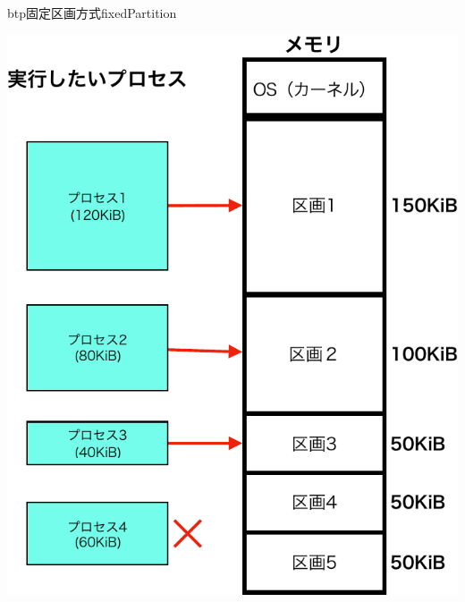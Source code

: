 \begin{myfig}{btp}{固定区画方式}{fixedPartition}
  \begin{minipage}{0.49\columnwidth}
    \begin{center}
      \includegraphics[scale=0.6]{Fig/fixedPartitionLoad-crop.pdf}
      \label{fig:fixedParthtionA}
    \end{center}
  \end{minipage}
  \begin{minipage}{0.49\columnwidth}
    \begin{center}

\end{center}
\end{minipage}
\end{myfig}
